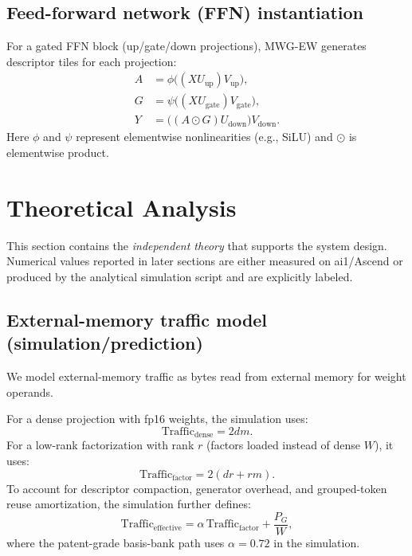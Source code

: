 \documentclass[11pt]{article}
\begin{document}
\subsection{Feed-forward network (FFN) instantiation}
For a gated FFN block (up/gate/down projections), MWG-EW generates descriptor tiles for each projection:
\begin{align}
A &= \phi\big((XU_{\text{up}})V_{\text{up}}\big),
\\
G &= \psi\big((XU_{\text{gate}})V_{\text{gate}}\big),
\\
Y &= \big((A\odot G)U_{\text{down}}\big)V_{\text{down}}.
\end{align}
Here $\phi$ and $\psi$ represent elementwise nonlinearities (e.g., SiLU) and $\odot$ is elementwise product.

\section{Theoretical Analysis}
This section contains the 
\emph{independent theory} that supports the system design. Numerical values reported in later sections are either measured on ai1/Ascend or produced by the analytical simulation script and are explicitly labeled.

\subsection{External-memory traffic model (simulation/prediction)}
We model external-memory traffic as bytes read from external memory for weight operands.

For a dense projection with fp16 weights, the simulation uses:
\begin{equation}
\text{Traffic}_{\text{dense}} = 2dm.
\end{equation}
For a low-rank factorization with rank $r$ (factors loaded instead of dense $W$), it uses:
\begin{equation}
\text{Traffic}_{\text{factor}} = 2(dr + rm).
\end{equation}
To account for descriptor compaction, generator overhead, and grouped-token reuse amortization, the simulation further defines:
\begin{equation}
\text{Traffic}_{\text{effective}} = \alpha\,\text{Traffic}_{\text{factor}} + \frac{P_G}{W},
\end{equation}
where the patent-grade basis-bank path uses $\alpha=0.72$ in the simulation.
\end{document}
